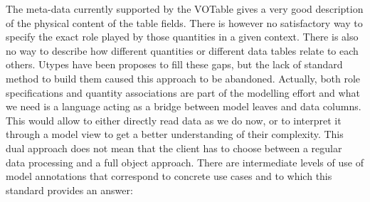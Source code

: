 The meta-data currently supported by the VOTable gives a very good description of the physical content of the table fields. 
There is however no satisfactory way to specify the exact role played by those quantities in a given context.
There is also no way to describe how different quantities or different data tables relate to each others.
Utypes have been proposes to fill these gaps, but the lack of standard method to build them caused this approach to be abandoned.
Actually, both role specifications and quantity associations are part of the modelling effort and what we need is a language acting as a bridge between model leaves and data columns.
This would allow to either directly read data as we do now, or to interpret it through a model view to get a better understanding of their complexity.
This dual approach does not mean that the client has to choose between a regular data processing and a full object approach.
There are intermediate levels of use of model annotations that correspond to concrete use cases and to which this standard provides an answer:

